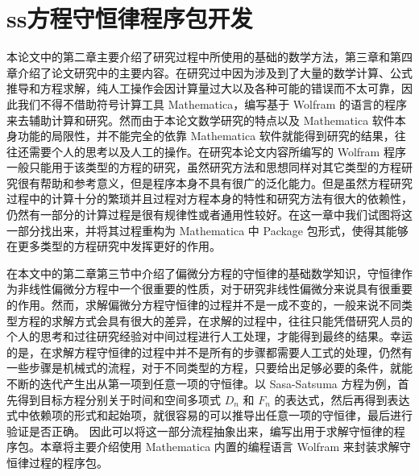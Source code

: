 
\chapter{ss方程守恒律程序包开发}
本论文中的第二章主要介绍了研究过程中所使用的基础的数学方法，第三章和第四章介绍了论文研究中的主要内容。在研究过中因为涉及到了大量的数学计算、公式推导和方程求解，纯人工操作会因计算量过大以及各种可能的错误而不太可靠，因此我们不得不借助符号计算工具 Mathematica，编写基于 Wolfram 的语言的程序来去辅助计算和研究。然而由于本论文数学研究的特点以及 Mathematica 软件本身功能的局限性，并不能完全的依靠 Mathematica 软件就能得到研究的结果，往往还需要个人的思考以及人工的操作。在研究本论文内容所编写的 Wolfram 程序一般只能用于该类型的方程的研究，虽然研究方法和思想同样对其它类型的方程研究很有帮助和参考意义，但是程序本身不具有很广的泛化能力。但是虽然方程研究过程中的计算十分的繁琐并且过程对方程本身的特性和研究方法有很大的依赖性，仍然有一部分的计算过程是很有规律性或者通用性较好。在这一章中我们试图将这一部分找出来，并将其过程重构为 Mathematica 中 Package 包形式，使得其能够在更多类型的方程研究中发挥更好的作用。

在本文中的第二章第三节中介绍了偏微分方程的守恒律的基础数学知识，守恒律作为非线性偏微分方程中一个很重要的性质，对于研究非线性偏微分来说具有很重要的作用。然而，求解偏微分方程守恒律的过程并不是一成不变的，一般来说不同类型方程的求解方式会具有很大的差异，在求解的过程中，往往只能凭借研究人员的个人的思考和过往研究经验对中间过程进行人工处理，才能得到最终的结果。幸运的是，在求解方程守恒律的过程中并不是所有的步骤都需要人工式的处理，仍然有一些步骤是机械式的流程，对于不同类型的方程，只要给出足够必要的条件，就能不断的迭代产生出从第一项到任意一项的守恒律。以 Sasa-Satsuma 方程为例，首先得到目标方程分别关于时间和空间多项式 $D_n$ 和 $F_n$ 的表达式，然后再得到表达式中依赖项的形式和起始项，就很容易的可以推导出任意一项的守恒律，最后进行验证是否正确。 因此可以将这一部分流程抽象出来，编写出用于求解守恒律的程序包。本章将主要介绍使用 Mathematica 内置的编程语言 Wolfram 来封装求解守恒律过程的程序包。

